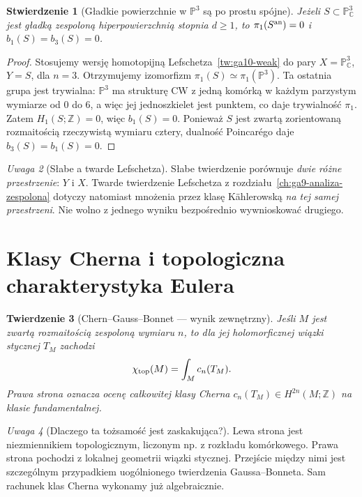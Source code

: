 \documentclass[11pt,a4paper,openany]{report}
\numberwithin{equation}{section}
\theoremstyle{plain}
\newtheorem{twierdzenie}{Twierdzenie}[section]
\newtheorem{stwierdzenie}[twierdzenie]{Stwierdzenie}
\theoremstyle{definition}
\theoremstyle{remark}
\newtheorem{uwaga}[twierdzenie]{Uwaga}
\newcommand{\Z}{\mathbb Z}
\newcommand{\C}{\mathbb C}
\newcommand{\PP}{\mathbb P}
\begin{document}
\begin{stwierdzenie}[Gładkie powierzchnie w $\PP^3$ są po prostu spójne]
\label{st:ga10-simplyconn}
Jeżeli $S\subset\PP^3_\C$ jest gładką zespoloną
hiperpowierzchnią stopnia $d\ge1$, to
$\pi_1(S^{\rm an})=0$ i $b_1(S)=b_3(S)=0$.
\end{stwierdzenie}
\begin{proof}
Stosujemy wersję homotopijną
Lefschetza~\ref{tw:ga10-weak} do pary
$X=\PP^3_\C$, $Y=S$, dla $n=3$.
Otrzymujemy izomorfizm $\pi_1(S)\simeq\pi_1(\PP^3)$.
Ta ostatnia grupa jest trywialna: $\PP^3$ ma strukturę
CW z jedną komórką w każdym parzystym wymiarze od $0$ do $6$,
a więc jej jednoszkielet jest punktem, co daje trywialność
$\pi_1$. Zatem $H_1(S;\Z)=0$, więc $b_1(S)=0$.
Ponieważ $S$ jest zwartą zorientowaną rozmaitością
rzeczywistą wymiaru cztery, dualność Poincarégo daje
$b_3(S)=b_1(S)=0$.
\end{proof}

\begin{uwaga}[Słabe a twarde Lefschetza]
Słabe twierdzenie porównuje \emph{dwie różne przestrzenie}:
$Y$ i $X$. Twarde twierdzenie Lefschetza z
rozdziału~\ref{ch:ga9-analiza-zespolona} dotyczy natomiast
mnożenia przez klasę Kählerowską \emph{na tej samej przestrzeni}.
Nie wolno z jednego wyniku bezpośrednio wywnioskować drugiego.
\end{uwaga}

\section{Klasy Cherna i topologiczna charakterystyka Eulera}
\label{sec:ga10-chern-euler}

\begin{twierdzenie}[Chern--Gauss--Bonnet — wynik zewnętrzny]
\label{tw:ga10-cgb}
Jeśli $M$ jest zwartą rozmaitością zespoloną wymiaru $n$,
to dla jej holomorficznej wiązki stycznej $T_M$ zachodzi
\[
 \chi_{\rm top}(M)=\int_M c_n(T_M).
\]
Prawa strona oznacza ocenę całkowitej klasy Cherna
$c_n(T_M)\in H^{2n}(M;\Z)$ na klasie fundamentalnej.
\end{twierdzenie}

\begin{uwaga}[Dlaczego ta tożsamość jest zaskakująca?]
Lewa strona jest niezmiennikiem topologicznym,
liczonym np. z rozkładu komórkowego. Prawa strona
pochodzi z lokalnej geometrii wiązki stycznej.
Przejście między nimi jest szczególnym przypadkiem
uogólnionego twierdzenia Gaussa--Bonneta.
Sam rachunek klas Cherna wykonamy już algebraicznie.
\end{uwaga}
\end{document}
